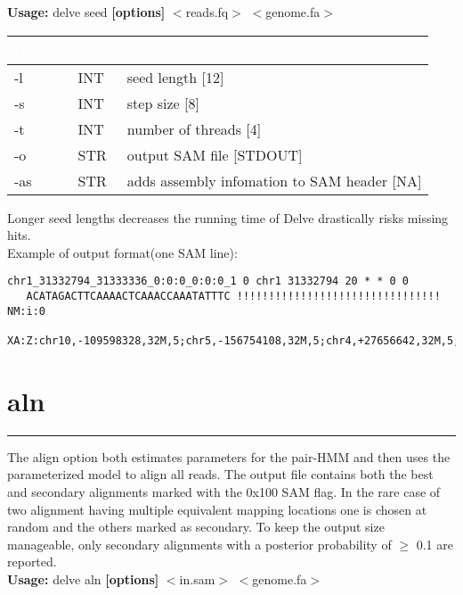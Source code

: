 \documentclass[11pt,a4paper,oneside]{book}
\begin{document}
{\bf Usage:} delve seed {\bf [options]} $<$reads.fq$>$ $<$genome.fa$>$\\


\begin{center}
\begin{tabular}{| l | l | p{12cm}|}
\hline
\rowcolor{blue} \textcolor{white}{\scshape Option}		&\textcolor{white}{\scshape Type}		&	\textcolor{white}{\scshape Description}\\ \hline
-l & INT & seed length [12] \\
-s & INT & step size [8] \\
-t & INT & number of threads [4]\\
-o & STR & output SAM file [STDOUT]\\
-as & STR & adds assembly infomation to SAM header [NA]\\
\hline
\end{tabular}
\end{center}

Longer seed lengths decreases the running time of Delve drastically risks missing hits.\\

Example of output format(one SAM line): 
{\small
\begin{verbatim}
chr1_31332794_31333336_0:0:0_0:0:0_1 0 chr1 31332794 20 * * 0 0
   ACATAGACTTCAAAACTCAAACCAAATATTTC !!!!!!!!!!!!!!!!!!!!!!!!!!!!!!!! NM:i:0 
   XA:Z:chr10,-109598328,32M,5;chr5,-156754108,32M,5;chr4,+27656642,32M,5;chrX,+146319453,32M;
\end{verbatim}
}


\newpage
\section{aln}
\rule[1cm]{\textwidth}{1pt}

The align option both estimates parameters for the pair-HMM and then uses the parameterized model to align all reads. The output file contains both the best and secondary alignments marked with the 0x100 SAM flag. In the rare case of two alignment having multiple equivalent mapping locations one is chosen at random and the others marked as secondary. To keep the output size manageable, only secondary alignments with a posterior probability of $\geq$ 0.1 are reported.\\ 

{\bf Usage:} delve aln {\bf [options]} $<$in.sam$>$ $<$genome.fa$>$\\
\end{document}
